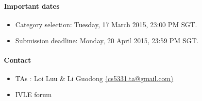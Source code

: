 \documentclass{article}[10pt]
\begin{document}
\paragraph{Important dates}
\begin{itemize}
	\item Category selection:  Tuesday, 17 March 2015,  23:00 PM SGT.
	\item Submission deadline: Monday, 20 April 2015, 23:59 PM SGT.
\end{itemize}

\paragraph{Contact}
\begin{itemize}
\item TAs : Loi Luu \& Li Guodong \href{mailto:cs5331.ta@gmail.com}{(cs5331.ta@gmail.com)}
\item IVLE forum
\end{itemize}
\end{document}
